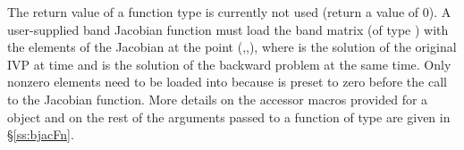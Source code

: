 {
  The return value of a  function type is currently not used
  (return a value of 0).
}
{
  A user-supplied band Jacobian function must load the band matrix 
  (of type ) with the elements of the Jacobian at the
  point (,,), where  is the solution
  of the original IVP at time  and  is the solution of the
  backward problem at the same time.  
  Only nonzero elements need to be loaded into
   because  is preset to zero before the call to the
  Jacobian function. More details on the accessor macros provided for
  a  object and on the rest of the arguments passed to a function
  of type  are given in \S\ref{ss:bjacFn}.
}

